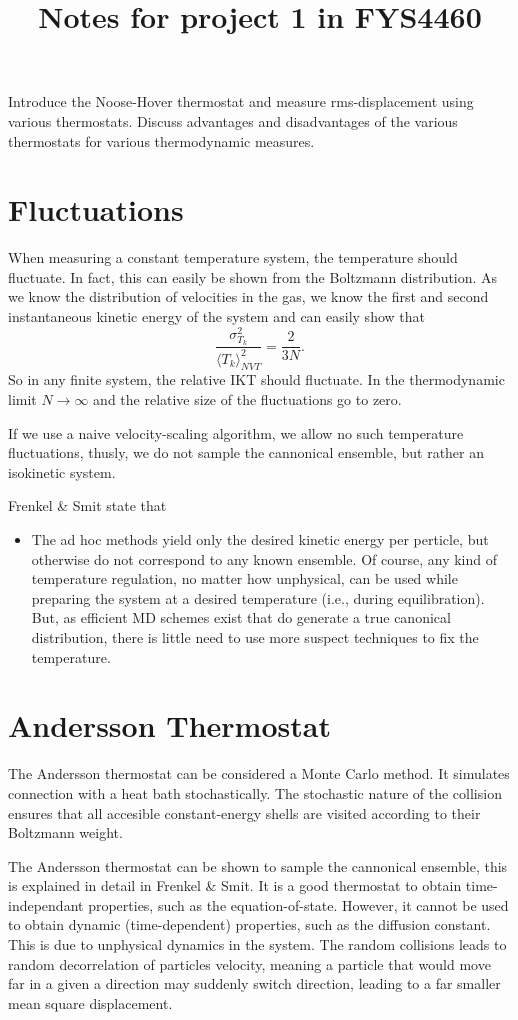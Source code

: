\documentclass[a4paper, 11pt, notitlepage, english]{article}
\author{}
\title{Notes for project 1 in FYS4460}
\begin{document}
Introduce the Noose-Hover thermostat and measure rms-displacement using various
thermostats. Discuss advantages and disadvantages of the various thermostats
for various thermodynamic measures.

\section*{Fluctuations}

When measuring a constant temperature system, the temperature should fluctuate. In fact, this can easily be shown from the Boltzmann distribution. As we know the distribution of velocities in the gas, we know the first and second instantaneous kinetic energy of the system and can easily show that
$$\frac{\sigma_{T_k}^2}{\langle T_k\rangle^2_{NVT}} = \frac{2}{3N}.$$
So in any finite system, the relative IKT should fluctuate. In the thermodynamic limit $N\to\infty$ and the relative size of the fluctuations go to zero.

If we use a naive velocity-scaling algorithm, we allow no such temperature fluctuations, thusly, we do not sample the cannonical ensemble, but rather an isokinetic system. 

Frenkel \& Smit state that 
\begin{itemize}
	\item The ad hoc methods yield only the desired kinetic energy per perticle, but otherwise do not correspond to any known ensemble. Of course, any kind of temperature regulation, no matter how unphysical, can be used while preparing the system at a desired temperature (i.e., during equilibration). But, as efficient MD schemes exist that do generate a true canonical distribution, there is little need to use more suspect techniques to fix the temperature.
\end{itemize}

\section*{Andersson Thermostat}

The Andersson thermostat can be considered a Monte Carlo method. It simulates connection with a heat bath stochastically. The stochastic nature of the collision ensures that all accesible constant-energy shells are visited according to their Boltzmann weight.

The Andersson thermostat can be shown to sample the cannonical ensemble, this is explained in detail in Frenkel \& Smit. It is a good thermostat to obtain time-independant properties, such as the equation-of-state. However, it cannot be used to obtain dynamic (time-dependent) properties, such as the diffusion constant. This is due to unphysical dynamics in the system. The random collisions leads to random decorrelation of particles velocity, meaning a particle that would move far in a given a direction may suddenly switch direction, leading to a far smaller mean square displacement.
\end{document}

